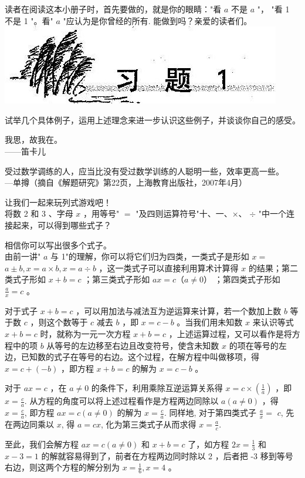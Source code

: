 \documentclass[10pt]{article}
\begin{document}
读者在阅读这本小册子时，首先要做的，就是你的眼睛："看 $a$ 不是 $a$ "， "看 1 不是 1 "。看" $a$ "应认为是你曾经的所有. 能做到吗？亲爱的读者们。\\
\includegraphics[max width=\textwidth, center]{2024_10_30_26b590fd1106d28139f0g-008}

试举几个具体例子，运用上述理念来进一步认识这些例子，并谈谈你自己的感受。

我思，故我在。\\
——笛卡儿

受过数学调练的人，应当比没有受过数学训练的人聪明一些，效率更高一些。\\
—单撙（摘自《解题研究》第22页，上海教育出版社，2007年4月）

让我们一起来玩列式游戏吧！\\
将数 2 和 3 、字母 $x$ ，用等号" $=$ "及四则运算符号"十、一、×、 $\div$ "中一个连接起来，可以得到哪些式子？

相信你可以写出很多个式子。\\
由前一讲" $a$ 与 1"的理解，你可以将它们归为四类，一类式子是形如 $x=$ $a \pm b, x=a \times b, x=a \div b$ ，这一类式子可以直接利用算术计算得 $x$ 的结果；第二类式子形如 $x+b=c$ ；第三类式子形如 $a x=c（a \neq 0）$ ；第四类式子形如 $\frac{a}{x}=c$ 。

对于式子 $x+b=c$ ，可以用加法与减法互为逆运算来计算，若一个数加上数 $b$ 等于数 $c$ ，则这个数等于 $c$ 减去 $b$ ，即 $x=c-b$ 。当我们用未知数 $x$ 来认识等式 $x+b=c$ 时，就称为一元一次方程 $x+b=c$ ，上述运算过程，又可以看作是将方程中的项 $b$ 从等号的左边移至右边且改变符号，使含未知数 $x$ 的项在等号的左边，已知数的式子在等号的右边。这个过程，在解方程中叫做移项，得 $x=c+(-b)$ ，即方程 $x+b=c$ 的解为 $x=c-b$ 。

对于 $a x=c$ ，在 $a \neq 0$ 的条件下，利用乘除互逆运算关系得 $x=c \times\left(\frac{1}{a}\right)$ ，即 $x=\frac{c}{a}$. 从方程的角度可以将上述过程看作是方程两边同除以 $a(a \neq 0)$ ，得 $x=\frac{c}{a}$, 即方程 $a x=c(a \neq 0)$ 的解为 $x=\frac{c}{a}$. 同样地, 对于第四类式子 $\frac{a}{x}=$ $c$, 先在两边同乘以 $x$, 得 $a=c x$, 化为第三类式子从而求得 $x=\frac{a}{c}$.

至此，我们会解方程 $a x=c(a \neq 0)$ 和 $x+b=c$ 了，如方程 $2 x=\frac{1}{3}$ 和 $x-3=1$ 的解就容易得到了，前者在方程两边同时除以 2 ，后者把 -3 移到等号右边，则这两个方程的解分别为 $x=\frac{1}{6}, x=4$ 。
\end{document}
